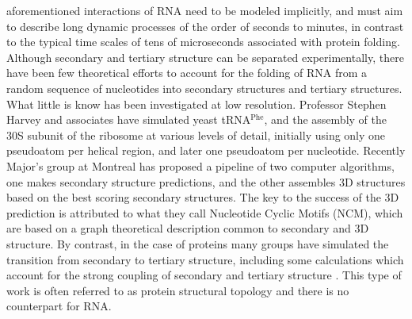 aforementioned interactions of RNA  need to be modeled implicitly, and
must aim to describe long dynamic processes of the order of seconds to
minutes,  in  contrast   to  the  typical  time  scales   of  tens  of
microseconds associated with protein folding.
Although   secondary   and  tertiary   structure   can  be   separated
experimentally, there have been few theoretical efforts to account for
the  folding  of  RNA  from  a random  sequence  of  nucleotides  into
secondary structures and tertiary  structures. What little is know has
been  investigated at  low  resolution. Professor  Stephen Harvey  and
associates     have     simulated     yeast     tRNA$^{\textrm{Phe}}$,
\cite{malhotra1990}  and  the  assembly  of  the 30S  subunit  of  the
ribosome \cite{stagg2003} at various levels of detail, initially using
only one pseudoatom  per helical region, and later  one pseudoatom per
nucleotide. Recently Major's group \cite{parisien2008} at Montreal has
proposed a  pipeline of two  computer algorithms, one  makes secondary
structure predictions, and the  other assembles 3D structures based on
the best scoring  secondary structures. The key to  the success of the
3D prediction is attributed to what they call Nucleotide Cyclic Motifs
(NCM), which  are based on  a graph theoretical description  common to
secondary and 3D structure.
By contrast,  in the case of  proteins many groups  have simulated the
transition  from  secondary  to  tertiary  structure,  including  some
calculations which  account for the  strong coupling of  secondary and
tertiary  structure   \cite{westhead1999,  gerstein2003,  meiler2003}.
This type of work is  often referred to as protein structural topology
and there is no counterpart for RNA.

